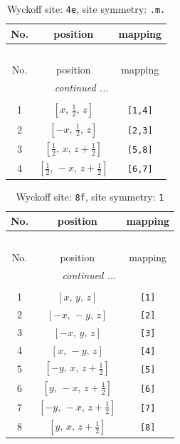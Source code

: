 \documentclass[fleqn,8pt]{jsarticle}
\begin{document}
\begin{longtable}{ccc}
\caption{Wyckoff site: {\tt 4e}, site symmetry: {\tt .m.}}
 \\
 \hline \hline
No. & position & mapping \\ \hline \endfirsthead

\multicolumn{2}{l}{\tablename\ \thetable{}} \\
 \hline \hline
No. & position & mapping \\ \hline \endhead

 \hline \hline
\multicolumn{2}{r}{\footnotesize\it continued ...} \\ \endfoot

 \hline \hline
\multicolumn{2}{r}{} \\ \endlastfoot

1 & $\left[ x,\, \frac{1}{2},\, z \right]$ & {\tt [1,4]} \\ \hline
2 & $\left[ - x,\, \frac{1}{2},\, z \right]$ & {\tt [2,3]} \\ \hline
3 & $\left[ \frac{1}{2},\, x,\, z + \frac{1}{2} \right]$ & {\tt [5,8]} \\ \hline
4 & $\left[ \frac{1}{2},\, - x,\, z + \frac{1}{2} \right]$ & {\tt [6,7]} \\
\end{longtable}
\renewcommand{\arraystretch}{1.2}
\begin{longtable}{ccc}
\caption{Wyckoff site: {\tt 8f}, site symmetry: {\tt 1}}
 \\
 \hline \hline
No. & position & mapping \\ \hline \endfirsthead

\multicolumn{2}{l}{\tablename\ \thetable{}} \\
 \hline \hline
No. & position & mapping \\ \hline \endhead

 \hline \hline
\multicolumn{2}{r}{\footnotesize\it continued ...} \\ \endfoot

 \hline \hline
\multicolumn{2}{r}{} \\ \endlastfoot

1 & $\left[ x,\, y,\, z \right]$ & {\tt [1]} \\ \hline
2 & $\left[ - x,\, - y,\, z \right]$ & {\tt [2]} \\ \hline
3 & $\left[ - x,\, y,\, z \right]$ & {\tt [3]} \\ \hline
4 & $\left[ x,\, - y,\, z \right]$ & {\tt [4]} \\ \hline
5 & $\left[ - y,\, x,\, z + \frac{1}{2} \right]$ & {\tt [5]} \\ \hline
6 & $\left[ y,\, - x,\, z + \frac{1}{2} \right]$ & {\tt [6]} \\ \hline
7 & $\left[ - y,\, - x,\, z + \frac{1}{2} \right]$ & {\tt [7]} \\ \hline
8 & $\left[ y,\, x,\, z + \frac{1}{2} \right]$ & {\tt [8]} \\
\end{longtable}
\end{document}
